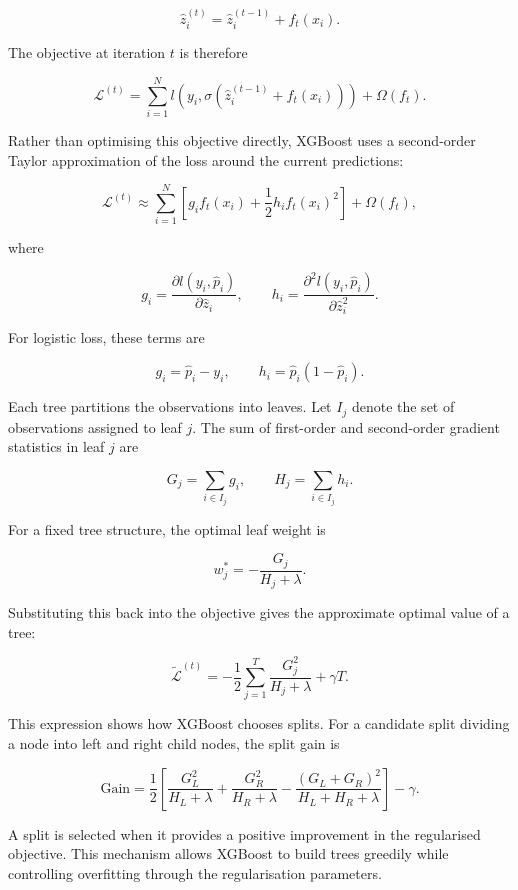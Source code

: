 \[
\hat{z}_i^{(t)}
=
\hat{z}_i^{(t-1)}
+
f_t(x_i).
\]

The objective at iteration \(t\) is therefore

\[
\mathcal{L}^{(t)}
=
\sum_{i=1}^{N}
l\left(y_i,\sigma\left(\hat{z}_i^{(t-1)}+f_t(x_i)\right)\right)
+
\Omega(f_t).
\]

Rather than optimising this objective directly, XGBoost uses a second-order Taylor
approximation of the loss around the current predictions:

\[
\mathcal{L}^{(t)}
\approx
\sum_{i=1}^{N}
\left[
g_i f_t(x_i)
+
\frac{1}{2}h_i f_t(x_i)^2
\right]
+
\Omega(f_t),
\]

where

\[
g_i
=
\frac{\partial l(y_i,\hat{p}_i)}
{\partial \hat{z}_i},
\qquad
h_i
=
\frac{\partial^2 l(y_i,\hat{p}_i)}
{\partial \hat{z}_i^2}.
\]

For logistic loss, these terms are

\[
g_i = \hat{p}_i - y_i,
\qquad
h_i = \hat{p}_i(1-\hat{p}_i).
\]

Each tree partitions the observations into leaves. Let \(I_j\) denote the set of
observations assigned to leaf \(j\). The sum of first-order and second-order
gradient statistics in leaf \(j\) are

\[
G_j = \sum_{i \in I_j} g_i,
\qquad
H_j = \sum_{i \in I_j} h_i.
\]

For a fixed tree structure, the optimal leaf weight is

\[
w_j^{*}
=
-
\frac{G_j}{H_j+\lambda}.
\]

Substituting this back into the objective gives the approximate optimal value of a
tree:

\[
\tilde{\mathcal{L}}^{(t)}
=
-
\frac{1}{2}
\sum_{j=1}^{T}
\frac{G_j^2}{H_j+\lambda}
+
\gamma T.
\]

This expression shows how XGBoost chooses splits. For a candidate split dividing a
node into left and right child nodes, the split gain is

\[
\mathrm{Gain}
=
\frac{1}{2}
\left[
\frac{G_L^2}{H_L+\lambda}
+
\frac{G_R^2}{H_R+\lambda}
-
\frac{(G_L+G_R)^2}{H_L+H_R+\lambda}
\right]
-
\gamma.
\]

A split is selected when it provides a positive improvement in the regularised
objective. This mechanism allows XGBoost to build trees greedily while controlling
overfitting through the regularisation parameters.

